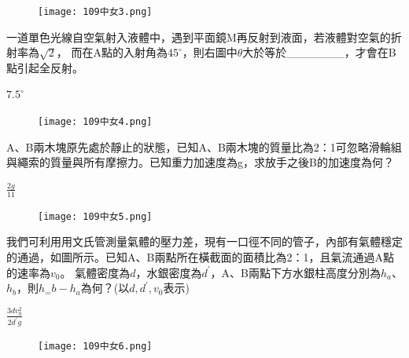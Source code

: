 \documentclass[cn,10pt,math=newtx,chinesefont=founder,device=ig]{elegantbook}
\begin{document}
\begin{figure}[htbp]
  \flushright
  \texttt{[image: 109中女3.png]}
\end{figure}
\newpage
\begin{example}
  一道單色光線自空氣射入液體中，遇到平面鏡M再反射到液面，若液體對空氣的折射率為$\sqrt{2}$，
  而在A點的入射角為$45^\circ$，則右圖中$\theta$大於等於\_\_\_\_\_\_\_，才會在B點引起全反射。\\
  \rightline{[台中女中教甄109]} 
\end{example}
\begin{solution}
  $7.5^\circ$
\end{solution}
\begin{figure}[htbp]
  \flushright
  \texttt{[image: 109中女4.png]}
\end{figure}
\newpage
\begin{example}
  A、B兩木塊原先處於靜止的狀態，已知A、B兩木塊的質量比為2：1可忽略滑輪組與繩索的質量與所有摩擦力。已知重力加速度為g，求放手之後B的加速度為何？\\
  \rightline{[台中女中教甄109]}
\end{example}
\begin{solution}
  $\frac{2g}{11}$
\end{solution}
\begin{figure}[htbp]
  \flushright
  \texttt{[image: 109中女5.png]}
\end{figure}
\newpage
\begin{example}
  我們可利用用文氏管測量氣體的壓力差，現有一口徑不同的管子，內部有氣體穩定的通過，如圖所示。已知A、B兩點所在橫截面的面積比為2：1，且氣流通過A點的速率為$v_0$。
  氣體密度為$d$，水銀密度為$d^\prime$，A、B兩點下方水銀柱高度分別為$h_a$、$h_b$，則$h_=b-h_a$為何？(以$d, d^\prime, v_0$表示)\\
  \rightline{[台中女中教甄109]}
\end{example}
\begin{solution}
  $\frac{3dv_{0}^{2}}{2d^\prime g}$
\end{solution}
\begin{figure}[htbp]
  \flushright
  \texttt{[image: 109中女6.png]}
\end{figure}
\newpage
\end{document}
